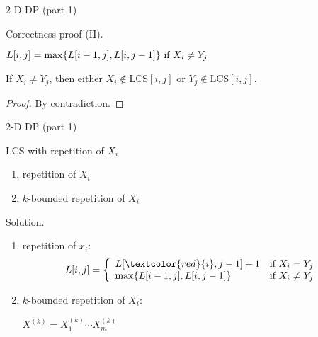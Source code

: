 \begin{frame}{2-D DP (part 1)}
  \begin{block}{Correctness proof (II).}
    \begin{theorem}{}
      $L[i,j] = \max \{L[i-1,j], L[i,j-1]\} \text{ if } X_{i} \neq Y_{j}$
    \end{theorem}

    \begin{theorem}{}
      If $X_{i} \neq Y_{j}$, then either $X_{i} \notin \text{LCS}[i,j]$ or $Y_{j} \notin \text{LCS}[i,j]$.
    \end{theorem}
    \begin{proof}
      By contradiction.
    \end{proof}
  \end{block}
\end{frame}
\begin{frame}{2-D DP (part 1)}
  \begin{exampleblock}{LCS with repetition of $X_{i}$ }
    \begin{enumerate}
      \item repetition of $X_{i}$
      \item $k$-bounded repetition of $X_{i}$
    \end{enumerate}
  \end{exampleblock}

  \begin{block}{Solution.}
    \begin{enumerate}
      \item repetition of $x_{i}$:
	\begin{displaymath}
	  L[i,j] = \left\{ \begin{array}{ll}
	    L[\textcolor{red}{i}, j-1] + 1 & \textrm{if $X_{i} = Y_{j}$}\\
	    \max \set{L[i-1,j], L[i,j-1]} & \textrm{if $X_{i} \neq Y_{j}$}
	  \end{array} \right.
	\end{displaymath}
      \item $k$-bounded repetition of $X_{i}$:

	$X^{(k)} = X_{1}^{(k)} \cdots X_{m}^{(k)}$
    \end{enumerate}
  \end{block}
\end{frame}
